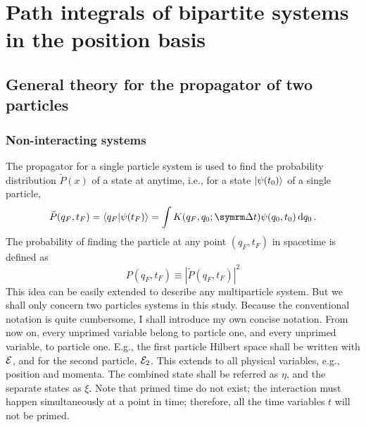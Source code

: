 \chapter{Path integrals of bipartite systems in the position basis}

\section{General theory for the propagator of two particles}
\label{sec:general_theory_propagator_position}

\subsection{Non-interacting systems}

The propagator for a single particle system is used to find the probability distribution $\tilde{P}(x)$ of a state at anytime, i.e., for a state $\ket{\psi(t_0)}$ of a single particle,
\begin{equation}
    \tilde{P}(q_F, t_F) = \braket{q_F}{\psi(t_F)} = \int K(q_F, q_0; \Dd{t})\psi(q_0, t_0)\dd{q_0}.
\end{equation}
The probability of finding the particle at any point $(q_F, t_F)$ in spacetime is defined as
\begin{equation}
    P(q_F, t_F) \equiv |\tilde{P}(q_F, t_F)|^2
\end{equation}
This idea can be easily extended to describe any multiparticle system. But we shall only concern two particles systems in this study. Because the conventional notation is quite cumbersome, I shall introduce my own concise notation. From now on, every unprimed variable belong to particle one, and every unprimed variable, to particle one. E.g., the first particle Hilbert space shall be written with $\mathcal{E}$, and for the second particle, $\mathcal{E}_2$. This extends to all physical variables, e.g., position and momenta. The combined state shall be referred as $\eta$, and the separate states as $\xi$. Note that primed time do not exist; the interaction must happen simultaneously at a point in time; therefore, all the time variables $t$ will not be primed.

